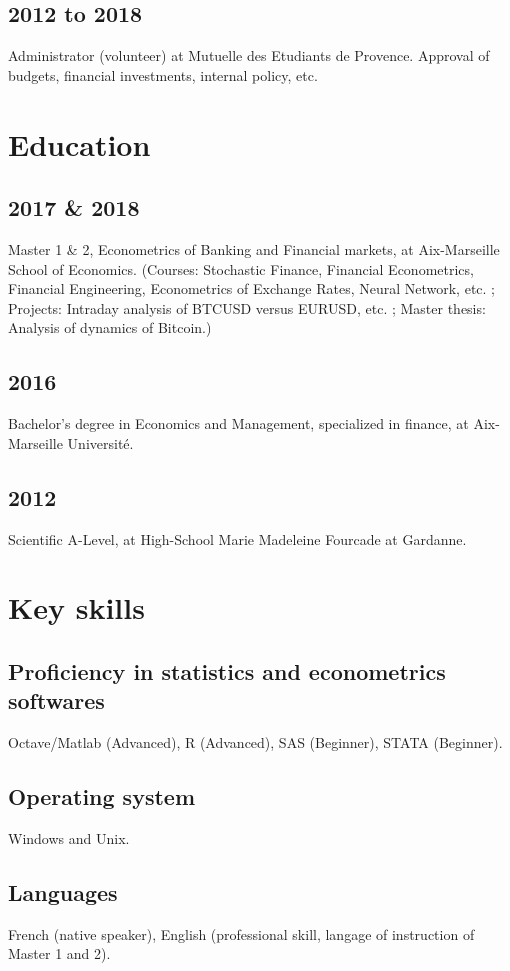 \documentclass[a4paper,11pt]{arthur-cv}
\begin{document}
\begin{textblock}{20.5}
\begin{minipage}[t]{0.62\textwidth}
      \subsection{2012 to 2018}{Administrator (volunteer) at Mutuelle des Etudiants de Provence. Approval of budgets, financial investments, internal policy, etc.}

    \section{Education}
      \subsection{2017 \& 2018}{Master 1 \& 2, Econometrics of Banking and Financial markets, at Aix-Marseille School of Economics. (Courses: Stochastic Finance, Financial Econometrics, Financial Engineering, Econometrics of Exchange Rates, Neural Network, etc. ; Projects: Intraday analysis of BTCUSD versus EURUSD, etc. ; Master thesis: Analysis of dynamics of Bitcoin.)}
      \subsection{2016}{Bachelor’s degree in Economics and Management, specialized in finance, at Aix-Marseille Université.}
      \subsection{2012}{Scientific A-Level, at High-School Marie Madeleine Fourcade at Gardanne.}

    \section{Key skills}
      \subsection{Proficiency in statistics and econometrics softwares}{Octave/Matlab (Advanced), R (Advanced), SAS (Beginner), STATA (Beginner).} 
      \subsection{Operating system}{Windows and Unix.}
      \subsection{Languages}{French (native speaker), English (professional skill, langage of instruction of Master 1 and 2).}


\end{minipage}
\end{textblock}
\end{document}
